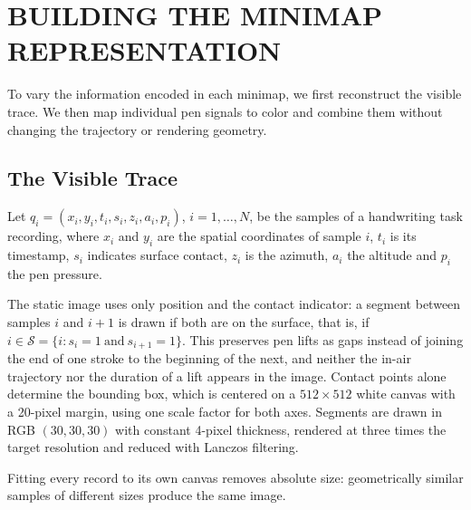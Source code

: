 \section{\uppercase{Building the Minimap Representation}}
\label{sec:encoding}

\noindent
To vary the information encoded in each minimap, we first reconstruct the visible trace. We then map individual pen signals to color and combine them without changing the trajectory or rendering geometry.

\subsection{The Visible Trace}
\noindent
Let $q_i=(x_i,y_i,t_i,s_i,z_i,a_i,p_i)$, $i=1,\dots,N$, be the samples of a handwriting task recording, where $x_i$ and $y_i$ are the spatial coordinates of sample $i$, $t_i$ is its timestamp, $s_i$ indicates surface contact, $z_i$ is the azimuth, $a_i$ the altitude and $p_i$ the pen pressure.

The static image uses only position and the contact indicator: a segment between samples $i$ and $i+1$ is drawn if both are on the surface, that is, if $i\in\mathcal{S}=\{i:s_i=1\ \mathrm{and}\ s_{i+1}=1\}$. This preserves pen lifts as gaps instead of joining the end of one stroke to the beginning of the next, and neither the in-air trajectory nor the duration of a lift appears in the image. Contact points alone determine the bounding box, which is centered on a $512\times512$ white canvas with a 20-pixel margin, using one scale factor for both axes. Segments are drawn in RGB $(30,30,30)$ with constant 4-pixel thickness, rendered at three times the target resolution and reduced with Lanczos filtering.

Fitting every record to its own canvas removes absolute size: geometrically similar samples of different sizes produce the same image.

